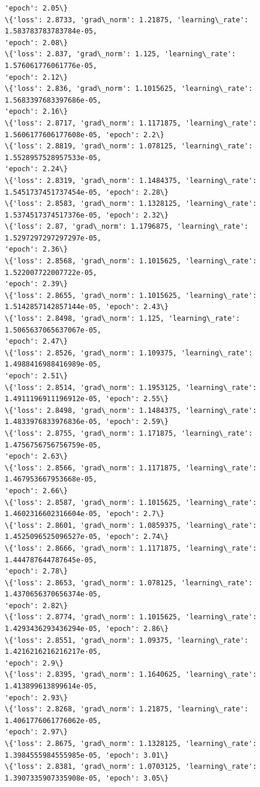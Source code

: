 \documentclass[11pt]{article}
\begin{document}
\begin{Verbatim}[commandchars=\\\{\}]
'epoch': 2.05\}
\{'loss': 2.8733, 'grad\_norm': 1.21875, 'learning\_rate': 1.583783783783784e-05,
'epoch': 2.08\}
\{'loss': 2.837, 'grad\_norm': 1.125, 'learning\_rate': 1.576061776061776e-05,
'epoch': 2.12\}
\{'loss': 2.836, 'grad\_norm': 1.1015625, 'learning\_rate': 1.5683397683397686e-05,
'epoch': 2.16\}
\{'loss': 2.8717, 'grad\_norm': 1.1171875, 'learning\_rate':
1.5606177606177608e-05, 'epoch': 2.2\}
\{'loss': 2.8819, 'grad\_norm': 1.078125, 'learning\_rate': 1.5528957528957533e-05,
'epoch': 2.24\}
\{'loss': 2.8319, 'grad\_norm': 1.1484375, 'learning\_rate':
1.5451737451737454e-05, 'epoch': 2.28\}
\{'loss': 2.8583, 'grad\_norm': 1.1328125, 'learning\_rate':
1.5374517374517376e-05, 'epoch': 2.32\}
\{'loss': 2.87, 'grad\_norm': 1.1796875, 'learning\_rate': 1.5297297297297297e-05,
'epoch': 2.36\}
\{'loss': 2.8568, 'grad\_norm': 1.1015625, 'learning\_rate': 1.522007722007722e-05,
'epoch': 2.39\}
\{'loss': 2.8655, 'grad\_norm': 1.1015625, 'learning\_rate':
1.5142857142857144e-05, 'epoch': 2.43\}
\{'loss': 2.8498, 'grad\_norm': 1.125, 'learning\_rate': 1.5065637065637067e-05,
'epoch': 2.47\}
\{'loss': 2.8526, 'grad\_norm': 1.109375, 'learning\_rate': 1.4988416988416989e-05,
'epoch': 2.51\}
\{'loss': 2.8514, 'grad\_norm': 1.1953125, 'learning\_rate':
1.4911196911196912e-05, 'epoch': 2.55\}
\{'loss': 2.8498, 'grad\_norm': 1.1484375, 'learning\_rate':
1.4833976833976836e-05, 'epoch': 2.59\}
\{'loss': 2.8755, 'grad\_norm': 1.171875, 'learning\_rate': 1.4756756756756759e-05,
'epoch': 2.63\}
\{'loss': 2.8566, 'grad\_norm': 1.1171875, 'learning\_rate': 1.467953667953668e-05,
'epoch': 2.66\}
\{'loss': 2.8587, 'grad\_norm': 1.1015625, 'learning\_rate':
1.4602316602316604e-05, 'epoch': 2.7\}
\{'loss': 2.8601, 'grad\_norm': 1.0859375, 'learning\_rate':
1.4525096525096527e-05, 'epoch': 2.74\}
\{'loss': 2.8666, 'grad\_norm': 1.1171875, 'learning\_rate': 1.444787644787645e-05,
'epoch': 2.78\}
\{'loss': 2.8653, 'grad\_norm': 1.078125, 'learning\_rate': 1.4370656370656374e-05,
'epoch': 2.82\}
\{'loss': 2.8774, 'grad\_norm': 1.1015625, 'learning\_rate':
1.4293436293436294e-05, 'epoch': 2.86\}
\{'loss': 2.8551, 'grad\_norm': 1.09375, 'learning\_rate': 1.4216216216216217e-05,
'epoch': 2.9\}
\{'loss': 2.8395, 'grad\_norm': 1.1640625, 'learning\_rate': 1.413899613899614e-05,
'epoch': 2.93\}
\{'loss': 2.8268, 'grad\_norm': 1.21875, 'learning\_rate': 1.4061776061776062e-05,
'epoch': 2.97\}
\{'loss': 2.8675, 'grad\_norm': 1.1328125, 'learning\_rate':
1.3984555984555985e-05, 'epoch': 3.01\}
\{'loss': 2.8381, 'grad\_norm': 1.0703125, 'learning\_rate':
1.3907335907335908e-05, 'epoch': 3.05\}

\end{Verbatim}
\end{document}
